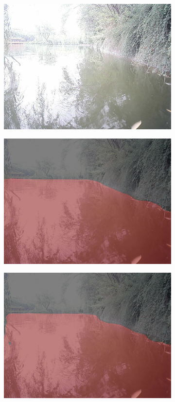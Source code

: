 \documentclass[cn,12pt,color=mine,scheme=chinese,bibstyle=gb7714-2015]{elegantbook}
\begin{document}
\begin{figure}[h]
\begin{subfigure}[b]{0.23\linewidth}
		\centering\includegraphics[width=\linewidth]{results2/test3}
	\end{subfigure}
	\begin{subfigure}[b]{0.23\linewidth}
		\centering\includegraphics[width=\linewidth]{results2/test3deeplab}
	\end{subfigure}
	\begin{subfigure}[b]{0.23\linewidth}
		\centering\includegraphics[width=\linewidth]{results2/test3setr}

\end{subfigure}
\end{figure}
\end{document}
